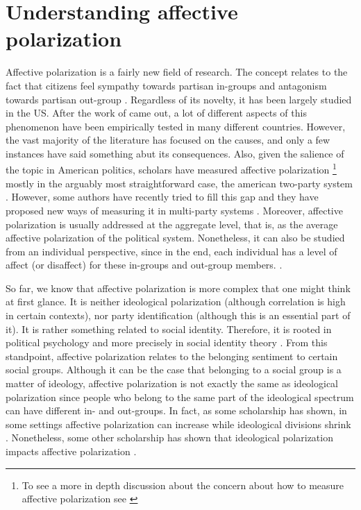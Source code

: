 \documentclass[a4paper, svgnames]{article}
\begin{document}
\section{Understanding affective polarization}
\label{affective polarization}

Affective polarization is a fairly new field of research. The concept relates to the fact that citizens feel sympathy towards partisan in-groups and antagonism towards partisan out-group \citep{Wagner2021}. Regardless of its novelty, it has been largely studied in the US. After the work of \cite{Iyengar2012} came out, a lot of different aspects of this phenomenon have been empirically tested in many different countries. However, the vast majority of the literature has focused on the causes, and only a few instances have said something abut its consequences. Also, given the salience of the topic in American politics, scholars have measured affective polarization \footnote{To see a more in depth discussion about the concern about how to measure affective polarization see \cite{Druckman2019a}} mostly in the arguably most straightforward case, the american two-party system \citep{Wagner2021}. However, some authors have recently tried to fill this gap and they have proposed new ways of measuring it in multi-party systems \citep{Reiljan2020}. Moreover, affective polarization is usually addressed at the aggregate level, that is, as the average affective polarization of the political system. Nonetheless, it can also be studied from an individual perspective, since in the end, each individual has a level of affect (or disaffect) for these in-groups and out-group members. \citep{Wagner2021}.

So far, we know that affective polarization is more complex that one might think at first glance. It is neither ideological polarization (although correlation is high in certain contexts), nor party identification (although this is an essential part of it). It is rather something related to social identity. Therefore, it is rooted in political psychology and more precisely in social identity theory \citep{Tajfel1979}. From this standpoint, affective polarization relates to the belonging sentiment to certain social groups. Although it can be the case that belonging to a social group is a matter of ideology, affective polarization is not exactly the same as ideological polarization since people who belong to the same part of the ideological spectrum can have different in- and out-groups. In fact, as some scholarship has shown, in some settings affective polarization can increase while ideological divisions shrink \citep{Levendusky2016, Iyengar2019}. Nonetheless, some other scholarship has shown that ideological polarization impacts affective polarization \citep{Rogowski2016, Webster2017}.
\end{document}
